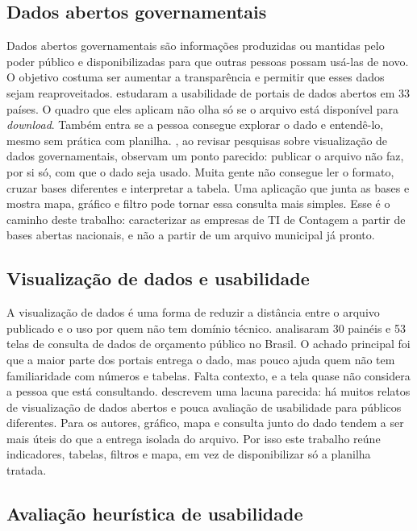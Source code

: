 \subsection{Dados abertos governamentais}

Dados abertos governamentais são informações produzidas ou mantidas pelo poder público e disponibilizadas para que outras pessoas possam usá-las de novo.
O objetivo costuma ser aumentar a transparência e permitir que esses dados sejam reaproveitados.
 estudaram a usabilidade de portais de dados abertos em 33 países.
O quadro que eles aplicam não olha só se o arquivo está disponível para \textit{download}.
Também entra se a pessoa consegue explorar o dado e entendê-lo, mesmo sem prática com planilha.
, ao revisar pesquisas sobre visualização de dados governamentais, observam um ponto parecido: publicar o arquivo não faz, por si só, com que o dado seja usado.
Muita gente não consegue ler o formato, cruzar bases diferentes e interpretar a tabela.
Uma aplicação que junta as bases e mostra mapa, gráfico e filtro pode tornar essa consulta mais simples.
Esse é o caminho deste trabalho: caracterizar as empresas de TI de Contagem a partir de bases abertas nacionais, e não a partir de um arquivo municipal já pronto.

\subsection{Visualização de dados e usabilidade}

A visualização de dados é uma forma de reduzir a distância entre o arquivo publicado e o uso por quem não tem domínio técnico.
 analisaram 30 painéis e 53 telas de consulta de dados de orçamento público no Brasil.
O achado principal foi que a maior parte dos portais entrega o dado, mas pouco ajuda quem não tem familiaridade com números e tabelas.
Falta contexto, e a tela quase não considera a pessoa que está consultando.
 descrevem uma lacuna parecida: há muitos relatos de visualização de dados abertos e pouca avaliação de usabilidade para públicos diferentes.
Para os autores, gráfico, mapa e consulta junto do dado tendem a ser mais úteis do que a entrega isolada do arquivo.
Por isso este trabalho reúne indicadores, tabelas, filtros e mapa, em vez de disponibilizar só a planilha tratada.

\subsection{Avaliação heurística de usabilidade}

